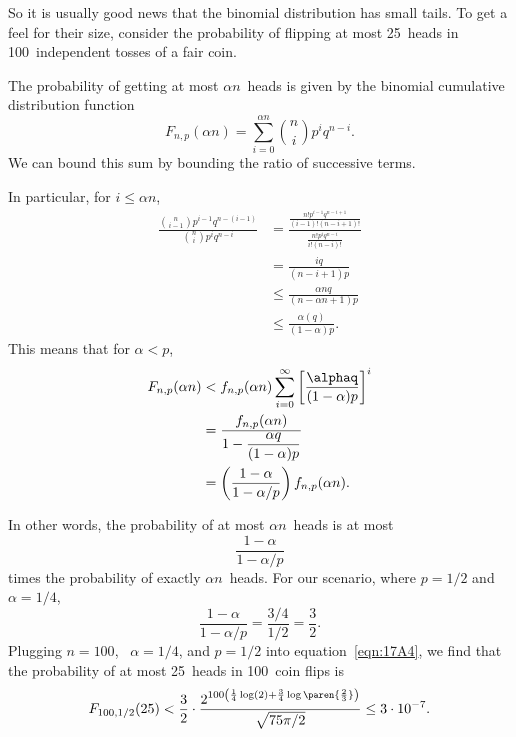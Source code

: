 \begin{editingnotes}
So it is usually good news that the binomial distribution has small
tails.  To get a feel for their size, consider the probability of
flipping at most 25~heads in 100~independent tosses of a fair coin.

The probability of getting at most $\alpha n$~heads is given by
the binomial cumulative distribution function
\begin{equation}\label{LN12:Jsum}
F_{n, p}(\alpha n)
    = \sum_{i = 0}^{\alpha n} \binom{n}{i} p^i q^{n - i}.
\end{equation}
We can bound this sum by bounding the ratio of successive terms.

In particular, for $i \le \alpha n$,
\begingroup
{}
\begin{align*}
\frac{ \displaystyle \binom{n}{i - 1} p^{i - 1} q^{n - (i - 1)} }
     { \displaystyle \binom{n}{i}     p^i       q^{n - i} }
    &=    \frac{\displaystyle
                  \frac{ n! p^{i - 1} q^{n - i + 1} }
                       { (i - 1)! (n - i + 1) ! }
              }
              {\displaystyle
                  \frac{ n! p^i q^{n - i} }
                       { i! (n - i)! }
              } \\
    &=    \frac{ i q }{ (n - i + 1) p } \\
    &\le  \frac{ \alpha n q }{ (n - \alpha n + 1) p } \\
    &\le  \frac{ \alpha (q) }{ (1 - \alpha) p }.
\end{align*}
\endgroup
This means that for $\alpha < p$,
\begingroup
{}
\begin{align}
F_{n, p}(\alpha n)
    &<  f_{n, p}(\alpha n)
        \sum_{i = 0}^\infty \left[ \frac{\alphaq}{(1 - \alpha)p}\right]^i
\notag \\
    &= \frac{\displaystyle f_{n, p}(\alpha n)}
            {\displaystyle 1 - \frac{\alpha q}{(1 - \alpha)p}}
            \notag\\
    &= \left( \frac{1 - \alpha}{1 - \alpha/p} \right) f_{n, p}(\alpha n).
\label{eqn:16F7}
\end{align}
\endgroup

In other words, the probability of at most $\alpha n$~heads is at most
\begin{equation*}
    \frac{1 - \alpha}{1 - \alpha/p}
\end{equation*}
times the probability of exactly $\alpha n$~heads. For our scenario,
where $p = 1/2$ and $\alpha = 1/4$,
\begin{equation*}
\frac{1 - \alpha}{1 - \alpha/p}
    = \frac{3/4}{1/2} %
    = \frac{3}{2}.
\end{equation*}
Plugging $n = 100$, \ $\alpha = 1/4$, and $p = 1/2$ into
equation~\eqref{eqn:17A4}, we find that the probability of at most
25~heads in 100~coin flips is
\begin{equation*}
F_{100, 1/2}(25)
    < \frac{3}{2} \cdot
        \frac{  \displaystyle
                2^{100 \left( \frac{1}{4} \log(2)
                     + \frac{3}{4} \log\paren{\frac{2}{3}} \right) }
             }
             { \sqrt{75 \pi /2} } %
    \le 3 \cdot 10^{-7}.
\end{equation*}


\end{editingnotes}
